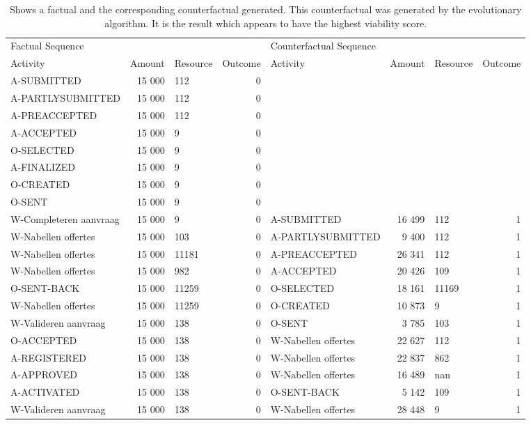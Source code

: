 \begin{table}
\caption{Shows a factual and the corresponding counterfactual generated. This counterfactual was generated by the evolutionary algorithm. It is the result which appears to have the highest viability score.}
\label{tbl:example-cf-evo}
\begin{tabular}{lrlrlrlr}
\toprule
\multicolumn{4}{l}{Factual Sequence} & \multicolumn{4}{l}{Counterfactual Sequence} \\
Activity & Amount & Resource & Outcome & Activity & Amount & Resource & Outcome \\
\midrule
A-SUBMITTED & 15 000 & 112 & 0 &  &  &  &  \\
A-PARTLYSUBMITTED & 15 000 & 112 & 0 &  &  &  &  \\
A-PREACCEPTED & 15 000 & 112 & 0 &  &  &  &  \\
A-ACCEPTED & 15 000 & 9 & 0 &  &  &  &  \\
O-SELECTED & 15 000 & 9 & 0 &  &  &  &  \\
A-FINALIZED & 15 000 & 9 & 0 &  &  &  &  \\
O-CREATED & 15 000 & 9 & 0 &  &  &  &  \\
O-SENT & 15 000 & 9 & 0 &  &  &  &  \\
W-Completeren aanvraag & 15 000 & 9 & 0 & A-SUBMITTED & 16 499 & 112 & 1 \\
W-Nabellen offertes & 15 000 & 103 & 0 & A-PARTLYSUBMITTED & 9 400 & 112 & 1 \\
W-Nabellen offertes & 15 000 & 11181 & 0 & A-PREACCEPTED & 26 341 & 112 & 1 \\
W-Nabellen offertes & 15 000 & 982 & 0 & A-ACCEPTED & 20 426 & 109 & 1 \\
O-SENT-BACK & 15 000 & 11259 & 0 & O-SELECTED & 18 161 & 11169 & 1 \\
W-Nabellen offertes & 15 000 & 11259 & 0 & O-CREATED & 10 873 & 9 & 1 \\
W-Valideren aanvraag & 15 000 & 138 & 0 & O-SENT & 3 785 & 103 & 1 \\
O-ACCEPTED & 15 000 & 138 & 0 & W-Nabellen offertes & 22 627 & 112 & 1 \\
A-REGISTERED & 15 000 & 138 & 0 & W-Nabellen offertes & 22 837 & 862 & 1 \\
A-APPROVED & 15 000 & 138 & 0 & W-Nabellen offertes & 16 489 & nan & 1 \\
A-ACTIVATED & 15 000 & 138 & 0 & O-SENT-BACK & 5 142 & 109 & 1 \\
W-Valideren aanvraag & 15 000 & 138 & 0 & W-Nabellen offertes & 28 448 & 9 & 1 \\
\bottomrule
\end{tabular}
\end{table}
